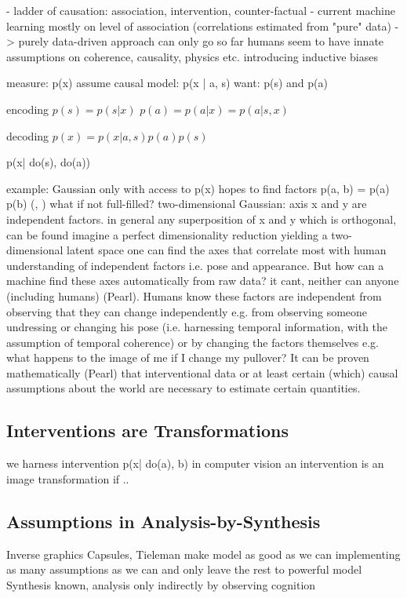 	- ladder of causation: association, intervention, counter-factual
	- current machine learning mostly on level of association (correlations estimated from "pure" data)
	-> purely data-driven approach can only go so far
	humans seem to have innate assumptions on coherence, causality, physics etc. introducing inductive biases


	measure: p(x)
	assume causal model: p(x | a, s)
	want: p(s) and p(a)

	encoding
	$p(s) = p(s | x )$
	$p(a) = p(a | x) = p(a | s, x)$

	decoding
	$p(x) = p(x | a, s) p(a) p(s)$

	p(x| do(s), do(a))

	example: Gaussian
	only with access to p(x)
	hopes to find factors p(a, b) = p(a) p(b) (\cite{chen16infogan}, \cite{higgins16betavae})
	what if not full-filled?
	two-dimensional Gaussian: axis x and y are independent factors.
	in general any superposition of x and y which is orthogonal, can be found
	imagine a perfect dimensionality reduction yielding a  two-dimensional latent space one can find the axes that correlate most with human understanding of independent factors i.e. pose and appearance.
	But how can a machine find these axes automatically from raw data? it cant, neither can anyone (including humans) (Pearl). Humans know these factors are independent from observing that they can change independently e.g. from observing someone undressing or changing his pose (i.e. harnessing temporal information, with the assumption of temporal coherence) or by changing the factors themselves e.g. what happens to the image of me if I change my pullover?
	It can be proven mathematically (Pearl) that interventional data or at least certain (which) causal assumptions about the world are necessary to estimate certain quantities.

	\subsection{Interventions are Transformations}
	we harness intervention
	p(x| do(a), b)
	in computer vision an intervention is an image transformation if ..


	\subsection{Assumptions in Analysis-by-Synthesis}
		Inverse graphics
		Capsules, Tieleman \cite{tieleman14thesis}
	make model as good as we can implementing as many assumptions as we can and only leave the rest to powerful model
	Synthesis known, analysis only indirectly by observing cognition

